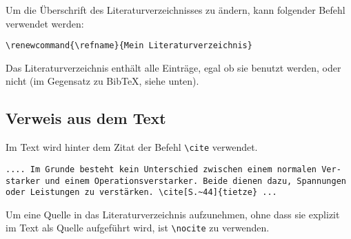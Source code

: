 Um die Überschrift des Literaturverzeichnisses zu ändern, kann folgender Befehl verwendet werden:
\begin{Verbatim}[frame=single]
\renewcommand{\refname}{Mein Literaturverzeichnis}
\end{Verbatim}
Das Literaturverzeichnis enthält alle Einträge, egal ob sie benutzt werden, oder nicht (im Gegensatz zu BibTeX, siehe unten).

\subsection{Verweis aus dem Text}
Im Text wird hinter dem Zitat der Befehl \verb|\cite| verwendet.
\begin{Verbatim}[frame=single]
.... Im Grunde besteht kein Unterschied zwischen einem normalen Ver-
starker und einem Operationsverstarker. Beide dienen dazu, Spannungen 
oder Leistungen zu verstärken. \cite[S.~44]{tietze} ...
\end{Verbatim}
Um eine Quelle in das Literaturverzeichnis aufzunehmen, ohne dass sie explizit im Text als Quelle aufgeführt wird, ist \verb|\nocite| zu verwenden.

\nocite{tietze}
